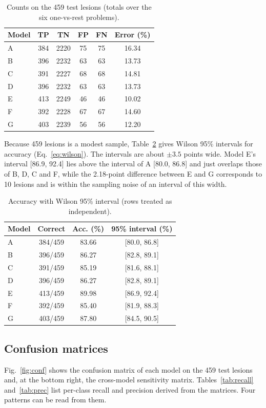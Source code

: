 \documentclass[conference]{IEEEtran}
\begin{document}
\begin{table}[!t]
\caption{Counts on the 459 test lesions (totals over the six one-vs-rest problems).}
\label{tab:counts}
\centering\footnotesize
\begin{tabular}{lccccc}
\toprule
Model & TP & TN & FP & FN & Error (\%) \\
\midrule
A & 384 & 2220 & 75 & 75 & 16.34 \\
B & 396 & 2232 & 63 & 63 & 13.73 \\
C & 391 & 2227 & 68 & 68 & 14.81 \\
D & 396 & 2232 & 63 & 63 & 13.73 \\
E & 413 & 2249 & 46 & 46 & 10.02 \\
F & 392 & 2228 & 67 & 67 & 14.60 \\
G & 403 & 2239 & 56 & 56 & 12.20 \\
\bottomrule
\end{tabular}
\end{table}


Because 459 lesions is a modest sample, Table~\ref{tab:ci} gives Wilson 95\% intervals for accuracy (Eq.~\eqref{eq:wilson}). The intervals are about $\pm3.5$ points wide. Model E's interval [86.9, 92.4] lies above the interval of A [80.0, 86.8] and just overlaps those of B, D, C and F, while the 2.18-point difference between E and G corresponds to 10 lesions and is within the sampling noise of an interval of this width.

\begin{table}[!t]
\caption{Accuracy with Wilson 95\% interval (rows treated as independent).}
\label{tab:ci}
\centering\footnotesize
\begin{tabular}{lccc}
\toprule
Model & Correct & Acc. (\%) & 95\% interval (\%) \\
\midrule
A & 384/459 & 83.66 & [80.0, 86.8] \\
B & 396/459 & 86.27 & [82.8, 89.1] \\
C & 391/459 & 85.19 & [81.6, 88.1] \\
D & 396/459 & 86.27 & [82.8, 89.1] \\
E & 413/459 & 89.98 & [86.9, 92.4] \\
F & 392/459 & 85.40 & [81.9, 88.3] \\
G & 403/459 & 87.80 & [84.5, 90.5] \\
\bottomrule
\end{tabular}
\end{table}


\subsection{Confusion matrices}
Fig.~\ref{fig:conf} shows the confusion matrix of each model on the 459 test lesions and, at the bottom right, the cross-model sensitivity matrix. Tables~\ref{tab:recall} and~\ref{tab:prec} list per-class recall and precision derived from the matrices. Four patterns can be read from them.
\end{document}
